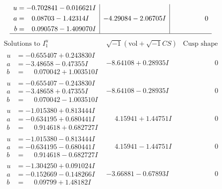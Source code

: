 \documentclass[1p]{elsarticle_modified}
\theoremstyle{definition}
\newcommand{\I}{\sqrt{-1}}
\begin{document}
$$\begin{array}{c|c|c}
\begin{aligned}
u &= -0.702841 - 0.016621 I \\
a &= \phantom{-}0.08703 - 1.42314 I \\
b &= \phantom{-}0.090578 - 1.409070 I\end{aligned}
 & -4.29084 - 2.06705 I & \phantom{-0.000000 } 0\\
 \hline 
 \end{array}$$\newpage$$\begin{array}{c|c|c}  
\text{Solutions to }I^u_{1}& \I (\text{vol} + \sqrt{-1}CS) & \text{Cusp shape}\\
 \hline 
\begin{aligned}
u &= -0.655407 + 0.243830 I \\
a &= -3.48658 - 0.47355 I \\
b &= \phantom{-}0.070042 + 1.003510 I\end{aligned}
 & -8.64108 + 0.28935 I & \phantom{-0.000000 } 0 \\ \hline\begin{aligned}
u &= -0.655407 - 0.243830 I \\
a &= -3.48658 + 0.47355 I \\
b &= \phantom{-}0.070042 - 1.003510 I\end{aligned}
 & -8.64108 - 0.28935 I & \phantom{-0.000000 } 0 \\ \hline\begin{aligned}
u &= -1.015380 + 0.813444 I \\
a &= -0.634195 + 0.680441 I \\
b &= \phantom{-}0.914618 + 0.682727 I\end{aligned}
 & \phantom{-}4.15941 + 1.44751 I & \phantom{-0.000000 } 0 \\ \hline\begin{aligned}
u &= -1.015380 - 0.813444 I \\
a &= -0.634195 - 0.680441 I \\
b &= \phantom{-}0.914618 - 0.682727 I\end{aligned}
 & \phantom{-}4.15941 - 1.44751 I & \phantom{-0.000000 } 0 \\ \hline\begin{aligned}
u &= -1.304250 + 0.091024 I \\
a &= -0.152669 - 0.148266 I \\
b &= \phantom{-}0.09799 + 1.48182 I\end{aligned}
 & -3.66881 - 0.67893 I & \phantom{-0.000000 } 0 \\ \hline\begin{aligned}

\end{aligned}
\end{array}$$
\end{document}
